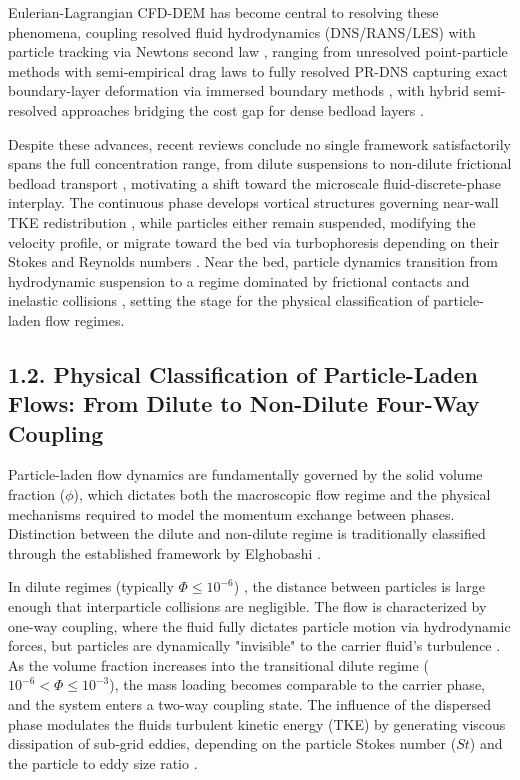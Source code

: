 Eulerian-Lagrangian CFD-DEM has become central to resolving these phenomena, coupling resolved fluid hydrodynamics (DNS/RANS/LES) with particle tracking via Newton\textquotesingle s second law \cite{capecelatro__2013,moreno-casas__2022,PEND_Vreman2008}, ranging from unresolved point-particle methods with semi-empirical drag laws \cite{PEND_Blais2016,PEND_Jaiswal2022} to fully resolved PR-DNS capturing exact boundary-layer deformation via immersed boundary methods \cite{brandt__2022,PEND_Mesa2021}, with hybrid semi-resolved approaches bridging the cost gap for dense bedload layers \cite{PEND_Chen2024,PEND_Xu2025}.

Despite these advances, recent reviews conclude no single framework satisfactorily spans the full concentration range, from dilute suspensions to non-dilute frictional bedload transport \cite{guta__2024,PEND_Li2020,zhou__2020}, motivating a shift toward the microscale fluid-discrete-phase interplay. The continuous phase develops vortical structures governing near-wall TKE redistribution \cite{PEND_Nezu1993,PEND_Pope2000}, while particles either remain suspended, modifying the velocity profile, or migrate toward the bed via turbophoresis depending on their Stokes and Reynolds numbers \cite{PEND_Bassenne2018,PEND_Elghobashi2006,nezu__2004}. Near the bed, particle dynamics transition from hydrodynamic suspension to a regime dominated by frictional contacts and inelastic collisions \cite{maurin__2017,PEND_Doren2023}, setting the stage for the physical classification of particle-laden flow regimes.

\subsection{1.2. Physical Classification of Particle-Laden Flows: From Dilute to Non-Dilute Four-Way Coupling}

Particle-laden flow dynamics are fundamentally governed by the solid volume fraction (\(\phi\)), which dictates both the macroscopic flow regime and the physical mechanisms required to model the momentum exchange between phases. Distinction between the dilute and non-dilute regime is traditionally classified through the established framework by Elghobashi \cite{elghobashi__1994,PEND_Elghobashi2006}.

In dilute regimes (typically \(\Phi \leq 10^{- 6}\)) \cite{elghobashi__1994}, the distance between particles is large enough that interparticle collisions are negligible. The flow is characterized by one-way coupling, where the fluid fully dictates particle motion via hydrodynamic forces, but particles are dynamically "invisible" to the carrier fluid's turbulence \cite{elghobashi__1994,PEND_Elghobashi2006,balachandar__2010,messa__2021}. As the volume fraction increases into the transitional dilute regime (\(10^{- 6} < \Phi \leq 10^{- 3}\)), the mass loading becomes comparable to the carrier phase, and the system enters a two-way coupling state. The influence of the dispersed phase modulates the fluid\textquotesingle s turbulent kinetic energy (TKE) by generating viscous dissipation of sub-grid eddies, depending on the particle Stokes number (\(St\)) and the particle to eddy size ratio \cite{balachandar__2010,hu__2025,PEND_Li2025,PEND_Liu2022}.

